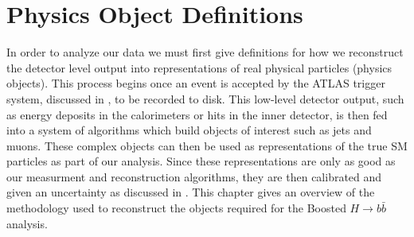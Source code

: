 \chapter{Physics Object Definitions} \label{chap:objects}

In order to analyze our data we must first give definitions for how we
reconstruct the detector level output into representations of real physical
particles (physics objects).  This process begins once an event is accepted by
the ATLAS trigger system, discussed in , to be recorded
to disk.  This low-level detector output, such as energy deposits in the
calorimeters or hits in the inner detector, is then fed into a system of
algorithms which build objects of interest such as jets and muons.  These
complex objects can then be used as representations of the true SM particles as
part of our analysis.  Since these representations are only as good as our
measurment and reconstruction algorithms, they are then calibrated and given an
uncertainty as discussed in . This chapter gives an
overview of the methodology used to reconstruct the objects required for the
Boosted $H \rightarrow b\bar{b}$ analysis.




